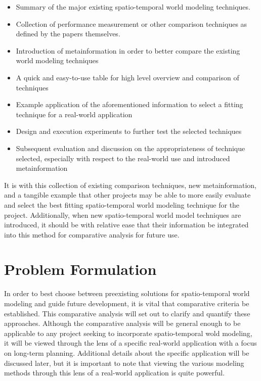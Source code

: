   \begin{itemize}
    \item Summary of the major existing spatio-temporal world modeling techniques.

    \item Collection of performance measurement or other comparison techniques as
      defined by the papers themselves.

    \item Introduction of metainformation in order to better compare the existing
      world modeling techniques

    \item A quick and easy-to-use table for high level overview and comparison of techniques

    \item Example application of the aforementioned information to select a fitting
      technique for a real-world application

    \item Design and execution experiments to further test the selected techniques

    \item Subsequent evaluation and discussion on the appropriateness of technique
      selected, especially with respect to the real-world use and introduced metainformation

  \end{itemize}

  It is with this collection of existing comparison techniques, new metainformation,
  and a tangible example that other projects may be able to more easily evaluate
  and select the best fitting spatio-temporal world modeling technique for the
  project. Additionally, when new spatio-temporal world model techniques are
  introduced, it should be with relative ease that their information be integrated
  into this method for comparative analysis for future use. \\



  \section{ Problem Formulation }

  In order to best choose between preexisting solutions for spatio-temporal
  world modeling and guide future development, it is vital that comparative criteria be
  established. This comparative analysis will set out to clarify and quantify
  these approaches. Although the comparative analysis will be general enough to be
  applicable to any project seeking to incorporate spatio-temporal wold modeling,
  it will be viewed through the lens of a specific real-world application
  with a focus on long-term planning. Additional details about the specific application
  will be discussed later, but it is important to note that viewing the
  various modeling methods through this lens of a real-world application is quite
  powerful. \\

